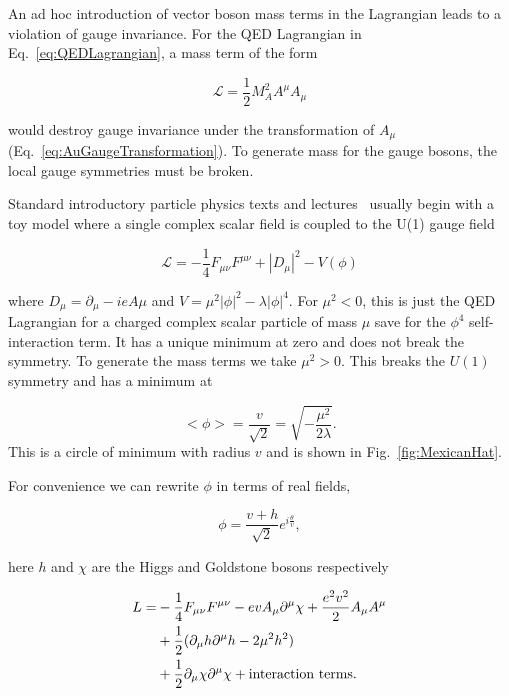 An ad hoc introduction of vector boson mass terms in the Lagrangian leads to a violation of gauge invariance. For the QED Lagrangian in Eq.~\ref{eq:QEDLagrangian}, a mass term of the form 

\begin{equation}
    \label{eq:AmuWrongMassterm}
    \mathcal{L} = \frac{1}{2}M^2_{A}A^{\mu}A_{\mu}
\end{equation}

would destroy gauge invariance under the transformation of $A_{\mu}$(Eq.~\ref{eq:AuGaugeTransformation}). To generate mass for the gauge bosons, the local gauge symmetries must be broken. 

Standard introductory particle physics texts and lectures~\cite{Halzen:1984mc}
usually begin with a toy model where a single complex scalar field is coupled to the U(1) gauge field 

\begin{equation}
    \label{eq:ToyScalarFieldLagrangian}
    \mathcal{L} = -\frac{1}{4} F_{\mu\nu}F^{\mu\nu} + |D_{\mu}|^2 - V(\phi)
\end{equation}


where $D_\mu = \partial_{\mu} - ieA{\mu}$ and $V =\mu^2 |\phi|^2 - \lambda |\phi|^4 $. For $\mu^2 < 0$, this is just the QED Lagrangian for a charged complex scalar particle of mass $\mu$ save for the $\phi^4$ self-interaction term. It has a unique minimum at zero and does not break the symmetry. To generate the mass terms we take $\mu^2 > 0$. This breaks the $U(1)$ symmetry and has a minimum at 

\begin{equation}
    \label{eq:Minimum}
    <\phi> = \frac{v}{\sqrt{2}} = \sqrt{-\frac{\mu^2}{2\lambda}}.
\end{equation}
This is a circle of minimum with radius $v$ and is shown in Fig.~\ref{fig:MexicanHat}. 

For convenience we can rewrite $\phi$ in terms of real fields, 

\begin{equation}
    \label{eq:RealFields}
    \phi = \frac{v+h}{\sqrt{2}}e^{i\frac{\theta}{v}},
\end{equation}

here $h$ and $\chi$ are the Higgs and Goldstone bosons respectively

\begin{align}
\label{eq:HiggsGoldstone}
    L = &-\frac{1}{4} F_{\mu\nu} F^{\mu\nu} - e v A_\mu \partial^\mu \chi + \frac{e^2 v^2}{2} A_\mu A^\mu \nonumber \\
    &+ \frac{1}{2} (\partial_\mu h \partial^\mu h - 2\mu^2 h^2) \nonumber \\
    &+ \frac{1}{2} \partial_\mu \chi \partial^\mu \chi + \textnormal{interaction terms}. \label{eq:HiggsGoldstone}
\end{align}


